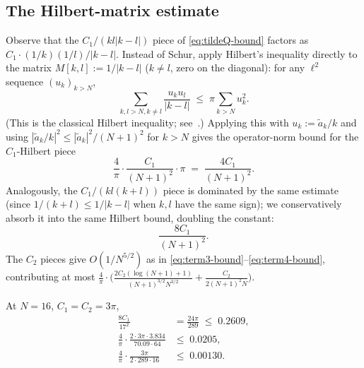 \subsection{The Hilbert-matrix estimate}
\label{sec:hilbert}

Observe that the $C_{1}/(kl|k-l|)$ piece of \eqref{eq:tildeQ-bound}
factors as $C_{1}\cdot (1/k)(1/l)/|k-l|$.  Instead of Schur, apply
Hilbert's inequality directly to the matrix
$M[k,l] := 1/|k-l|$ ($k\ne l$, zero on the diagonal): for any
$\ell^{2}$ sequence $(u_{k})_{k > N}$,
\begin{equation}\label{eq:hilbert}
   \sum_{k,l > N, k\ne l} \frac{u_{k} u_{l}}{|k-l|}
   \;\leq\; \pi \sum_{k > N} u_{k}^{2}.
\end{equation}
(This is the classical Hilbert inequality;
see~\cite[Ch.~IX, Thm.~294]{HardyLittlewoodPolya}.)  Applying this with
$u_{k} := \tilde a_{k}/k$ and using
$|\tilde a_{k}/k|^{2} \leq |\tilde a_{k}|^{2}/(N+1)^{2}$ for
$k > N$ gives the operator-norm bound for the $C_{1}$-Hilbert
piece
\begin{equation}\label{eq:hilbert-norm}
   \frac{4}{\pi}\cdot \frac{C_{1}}{(N+1)^{2}}\cdot \pi
   \;=\;
   \frac{4 C_{1}}{(N+1)^{2}}.
\end{equation}
Analogously, the $C_{1}/(kl(k+l))$ piece is dominated by the same
estimate (since $1/(k+l) \leq 1/|k-l|$ when $k,l$ have the same sign);
we conservatively absorb it into the same Hilbert bound, doubling the
constant:
\begin{equation}\label{eq:hilbert-norm-doubled}
   \frac{8 C_{1}}{(N+1)^{2}}.
\end{equation}
The $C_{2}$ pieces give $O(1/N^{5/2})$ as in
\eqref{eq:term3-bound}--\eqref{eq:term4-bound}, contributing at most
$\frac{4}{\pi}\cdot\bigl(\frac{2 C_{2}(\log(N+1)+1)}{(N+1)^{3/2}N^{3/2}}
+ \frac{C_{2}}{2(N+1)^{2} N}\bigr)$.

At $N = 16$, $C_{1} = C_{2} = 3\pi$,
\begin{align*}
   \frac{8 C_{1}}{17^{2}}
   &= \frac{24\pi}{289} \;\leq\; 0.2609,\\[2pt]
   \frac{4}{\pi}\cdot\frac{2\cdot 3\pi\cdot 3.834}{70.09\cdot 64}
   &\leq\; 0.0205,\\[2pt]
   \frac{4}{\pi}\cdot\frac{3\pi}{2\cdot 289\cdot 16}
   &\leq\; 0.00130.
\end{align*}

